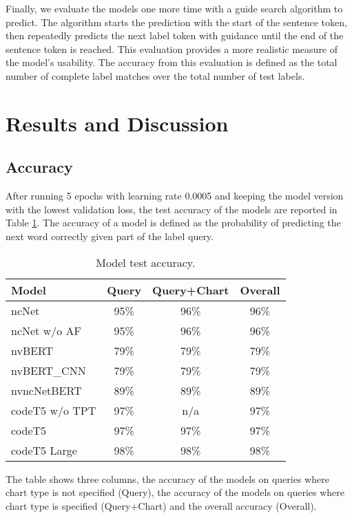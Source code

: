 \documentclass[
	a4paper, %
	10pt, %
	unnumberedsections, %
	twoside, %
]{t0003}
\begin{document}
Finally, we evaluate the models one more time with a guide search algorithm to predict. The algorithm starts the prediction with the start of the sentence token, then repeatedly predicts the next label token with guidance until the end of the sentence token is reached. This evaluation provides a more realistic measure of the model's usability. The accuracy from this evaluation is defined as the total number of complete label matches over the total number of test labels.

\section{Results and Discussion}

\subsection{Accuracy}

After running 5 epochs with learning rate 0.0005 and keeping the model version with the lowest validation loss, the test accuracy of the models are reported in Table \ref{tab:accuracy}. The accuracy of a model is defined as the probability of predicting the next word correctly given part of the label query.

\begin{table} %
	\caption{Model test accuracy.}
	\centering
	\begin{tabular}{lccc}
		\toprule
		Model & Query & Query+Chart & Overall \\
		\midrule
		ncNet & 95\% & 96\% & 96\% \\
		ncNet w/o AF & 95\% & 96\% & 96\% \\
		\hline
		nvBERT & 79\% & 79\% & 79\% \\
		nvBERT\_CNN & 79\% & 79\% & 79\% \\
		nvncNetBERT & 89\% & 89\% & 89\% \\
		\hline
		codeT5 w/o TPT & 97\% & n/a & 97\% \\
		codeT5 & 97\% & 97\% & 97\% \\
		codeT5 Large & 98\% & 98\% & 98\% \\
		\bottomrule
	\end{tabular}
	\label{tab:accuracy}
\end{table}

The table shows three columns, the accuracy of the models on queries where chart type is not specified (Query), the accuracy of the models on queries where chart type is specified (Query+Chart) and the overall accuracy (Overall).
\end{document}
